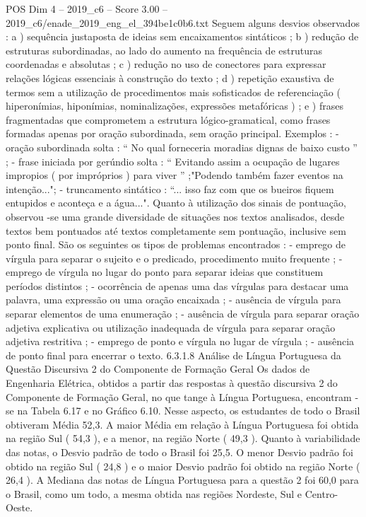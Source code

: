 \begin{textsample}{POS Dim 4 – 2019\_c6 – Score 3.00 – 2019\_c6/enade\_2019\_eng\_el\_394be1c0b6.txt}
Seguem alguns desvios observados : a ) sequência justaposta de ideias sem encaixamentos sintáticos ; b ) redução de estruturas subordinadas, ao lado do aumento na frequência de estruturas coordenadas e absolutas ; c ) redução no uso de conectores para expressar relações lógicas essenciais à construção do texto ; d ) repetição exaustiva de termos sem a utilização de procedimentos mais sofisticados de referenciação ( hiperonímias, hiponímias, nominalizações, expressões metafóricas ) ; e ) frases fragmentadas que comprometem a estrutura lógico-gramatical, como frases formadas apenas por oração subordinada, sem oração principal.
Exemplos : - oração subordinada solta : “ No qual forneceria moradias dignas de baixo custo ” ; - frase iniciada por gerúndio solta : “ Evitando assim a ocupação de lugares impropios ( por impróprios ) para viver ” ;"Podendo também fazer eventos na intenção..."; - truncamento sintático : “... isso faz com que os bueiros fiquem entupidos e aconteça e a água...".
Quanto à utilização dos sinais de pontuação, observou -se uma grande diversidade de situações nos textos analisados, desde textos bem pontuados até textos completamente sem pontuação, inclusive sem ponto final.
São os seguintes os tipos de problemas encontrados : - emprego de vírgula para separar o sujeito e o predicado, procedimento muito frequente ; - emprego de vírgula no lugar do ponto para separar ideias que constituem períodos distintos ; - ocorrência de apenas uma das vírgulas para destacar uma palavra, uma expressão ou uma oração encaixada ; - ausência de vírgula para separar elementos de uma enumeração ; - ausência de vírgula para separar oração adjetiva explicativa ou utilização inadequada de vírgula para separar oração adjetiva restritiva ; - emprego de ponto e vírgula no lugar de vírgula ; - ausência de ponto final para encerrar o texto. 6.3.1.8 Análise de Língua Portuguesa da Questão Discursiva 2 do Componente de Formação Geral Os dados de Engenharia Elétrica, obtidos a partir das respostas à questão discursiva 2 do Componente de Formação Geral, no que tange à Língua Portuguesa, encontram -se na Tabela 6.17 e no Gráfico 6.10.
Nesse aspecto, os estudantes de todo o Brasil obtiveram Média 52,3.
A maior Média em relação à Língua Portuguesa foi obtida na região Sul ( 54,3 ), e a menor, na região Norte ( 49,3 ).
Quanto à variabilidade das notas, o Desvio padrão de todo o Brasil foi 25,5.
O menor Desvio padrão foi obtido na região Sul ( 24,8 ) e o maior Desvio padrão foi obtido na região Norte ( 26,4 ).
A Mediana das notas de Língua Portuguesa para a questão 2 foi 60,0 para o Brasil, como um todo, a mesma obtida nas regiões Nordeste, Sul e Centro-Oeste.

\end{textsample}

